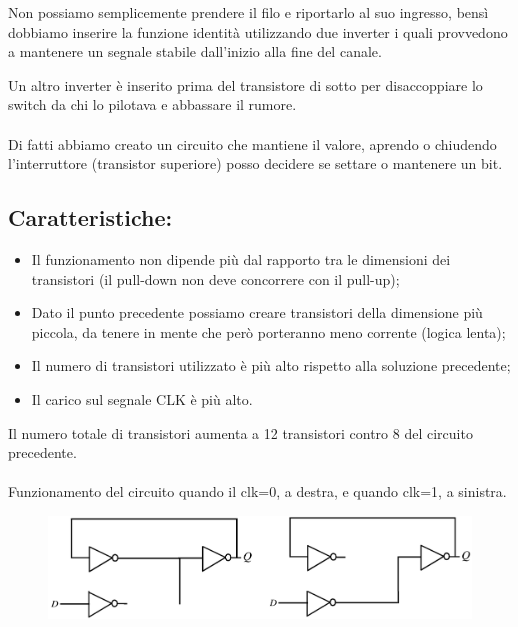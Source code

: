 Non possiamo semplicemente prendere il filo e riportarlo al suo ingresso, bensì dobbiamo inserire la funzione identità utilizzando due inverter i quali provvedono a mantenere un segnale stabile dall'inizio alla fine del canale. 

Un altro inverter è inserito prima del transistore di sotto per disaccoppiare lo switch da chi lo pilotava e abbassare il rumore.
\paragraph{}
Di fatti abbiamo creato un circuito che mantiene il valore, aprendo o chiudendo l'interruttore (transistor superiore) posso decidere se settare o mantenere un bit.

\subsection{Caratteristiche: }

\begin{itemize}
    \item Il funzionamento non dipende più dal rapporto tra le dimensioni dei transistori (il pull-down non deve concorrere con il pull-up);
    \item Dato il punto precedente possiamo creare transistori della dimensione più piccola, da tenere in mente che però porteranno meno corrente (logica lenta);
    \item Il numero di transistori utilizzato è più alto rispetto alla soluzione precedente;
    \item Il carico sul segnale CLK è più alto.
\end{itemize}

Il numero totale di transistori aumenta a 12 transistori contro 8 del circuito precedente.

\paragraph{}
Funzionamento del circuito quando il clk=0, a destra, e quando clk=1, a sinistra.

\begin{figure}[htbp]
    \centering
    \includegraphics[width=0.65\linewidth]{img/funzionamento_latch_multi.png}
\end{figure}

